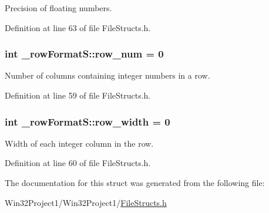 Precision of floating numbers. 



Definition at line 63 of file File\+Structs.\+h.

\subsubsection[{\texorpdfstring{row\+\_\+num}{row_num}}]{\setlength{\rightskip}{0pt plus 5cm}int \+\_\+row\+Format\+S\+::row\+\_\+num = 0}\hypertarget{struct__row_format_s_ac7451588121fa109b772db97b509e734}{}\label{struct__row_format_s_ac7451588121fa109b772db97b509e734}


Number of columns containing integer numbers in a row. 



Definition at line 59 of file File\+Structs.\+h.

\subsubsection[{\texorpdfstring{row\+\_\+width}{row_width}}]{\setlength{\rightskip}{0pt plus 5cm}int \+\_\+row\+Format\+S\+::row\+\_\+width = 0}\hypertarget{struct__row_format_s_a4f667918f753a059f84301db23d70e68}{}\label{struct__row_format_s_a4f667918f753a059f84301db23d70e68}


Width of each integer column in the row. 



Definition at line 60 of file File\+Structs.\+h.



The documentation for this struct was generated from the following file\+:\begin{DoxyCompactItemize}
\item 
Win32\+Project1/\+Win32\+Project1/\hyperlink{_file_structs_8h}{File\+Structs.\+h}\end{DoxyCompactItemize}
